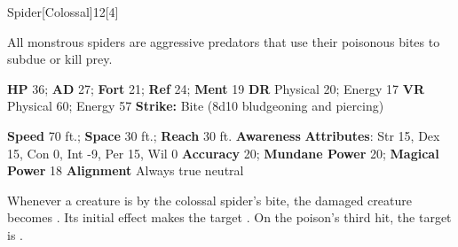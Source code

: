   
  \begin{monsection}{Spider}[Colossal]{12}[4]
    \vspace{-1em}\vspace{-1em}
    \vspace{0em}

    
    All monstrous spiders are aggressive predators that use their poisonous bites to subdue or kill prey.
  
    

    \begin{spellcontent}
      \begin{spelltargetinginfo}
        \pari \textbf{HP} 36;
          \textbf{AD} 27;
          \textbf{Fort} 21;
          \textbf{Ref} 24;
          \textbf{Ment} 19
        \pari \textbf{DR} Physical 20; Energy 17
        \pari \textbf{VR} Physical 60; Energy 57
        \pari \textbf{Strike:}
            Bite  (8d10 bludgeoning and piercing)
      \end{spelltargetinginfo}
    \end{spellcontent}
    \begin{monsterfooter}
      \pari \textbf{Speed} 70 ft.;
        \textbf{Space} 30 ft.;
        \textbf{Reach} 30 ft.
      \pari \textbf{Awareness} 
      \pari \textbf{Attributes}:
        Str 15, Dex 15,
        Con 0, Int -9,
        Per 15, Wil 0
      \pari \textbf{Accuracy} 20;
        \textbf{Mundane Power} 20;
      \textbf{Magical Power} 18
      \pari \textbf{Alignment} Always true neutral
    \end{monsterfooter}
  \end{monsection}
    Whenever a creature is  by the colossal spider's bite,
      the damaged creature becomes .
    Its initial effect makes the target .
    On the poison's third hit, the target is .
  
